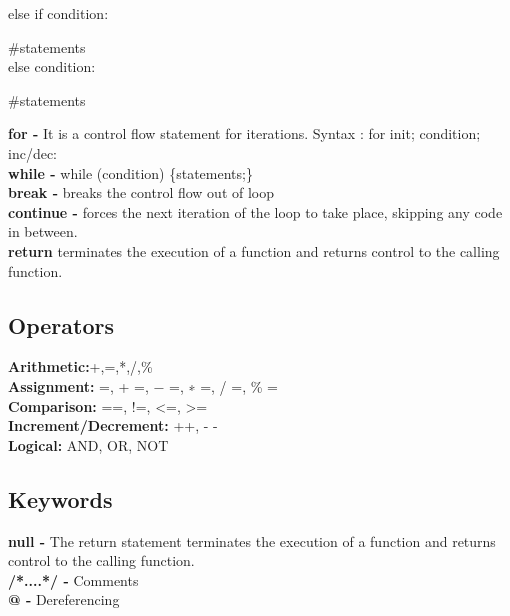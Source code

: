 \documentclass[11pt]{article}
\begin{document}
\qquad\qquad else if condition:

\qquad\qquad\qquad \#statements\\

\qquad\qquad else condition:

\qquad\qquad\qquad \#statements

\qquad \textbf{for -} It is a control flow statement for iterations. Syntax :  for init; condition; inc/dec: \\

\qquad \textbf{while -} while (condition) \{statements;\}\\

\qquad \textbf{break -} breaks the control flow out of loop \\

\qquad \textbf{continue -} forces the next iteration of the loop to take place, skipping any code in between. \\

\qquad \textbf{return} terminates the execution of a function and returns control to the calling function.

\subsection{Operators}

\qquad \qquad \textbf{Arithmetic:}+,=,*,/,\%\\

\qquad \textbf{Assignment:} =, + =, − =, ∗ =, / =, \% =\\

\qquad \textbf{Comparison:} ==, !=, <=, >= \\

\qquad \textbf{Increment/Decrement:} ++, - - \\

\qquad \textbf{Logical:} AND, OR, NOT

\subsection{ Keywords}
\qquad \qquad \textbf {null -} The return statement terminates the execution of a function and returns control to the calling function.\\

\qquad \textbf{/*....*/ - } Comments \\ 

\qquad \textbf{@ - } Dereferencing \\ 
\end{document}
